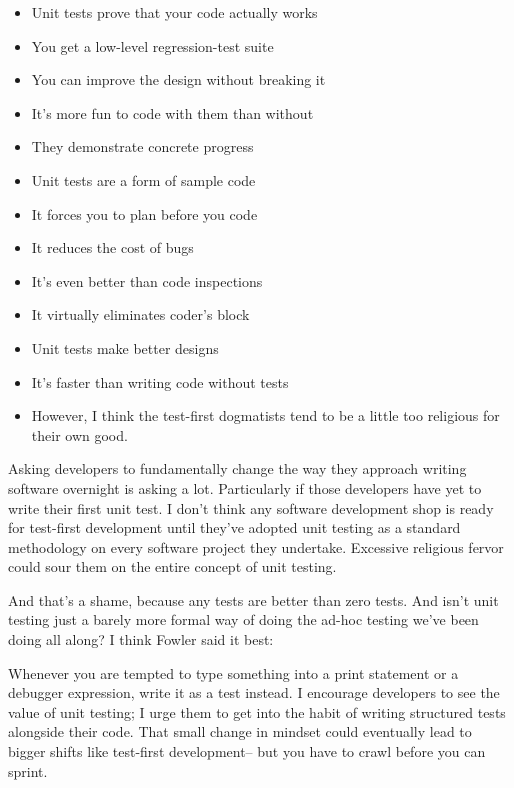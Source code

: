 \documentclass{42-en}
\begin{document}
    \begin{itemize}\itemsep1pt
      \item Unit tests prove that your code actually works
      \item You get a low-level regression-test suite
      \item You can improve the design without breaking it
      \item It's more fun to code with them than without
      \item They demonstrate concrete progress
      \item Unit tests are a form of sample code
      \item It forces you to plan before you code
      \item It reduces the cost of bugs
      \item It's even better than code inspections
      \item It virtually eliminates coder's block
      \item Unit tests make better designs
      \item It's faster than writing code without tests
      \item However, I think the test-first dogmatists tend to be a little too religious for their own good.\\
    \end{itemize}

Asking developers to fundamentally change the way they approach writing software overnight is asking a lot. Particularly if those developers have yet to write their first unit test. I don't think any software development shop is ready for test-first development until they've adopted unit testing as a standard methodology on every software project they undertake. Excessive religious fervor could sour them on the entire concept of unit testing.

And that's a shame, because any tests are better than zero tests. And isn't unit testing just a barely more formal way of doing the ad-hoc testing we've been doing all along? I think Fowler said it best:

Whenever you are tempted to type something into a print statement or a debugger expression, write it as a test instead.
I encourage developers to see the value of unit testing; I urge them to get into the habit of writing structured tests alongside their code. That small change in mindset could eventually lead to bigger shifts like test-first development-- but you have to crawl before you can sprint.
\end{document}
